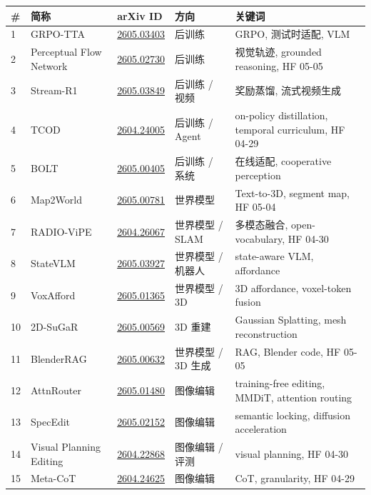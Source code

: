 \small
\begin{longtable}{p{0.7cm}p{3.0cm}p{2.5cm}p{2.5cm}p{4.8cm}}
\toprule
\# & 简称 & arXiv ID & 方向 & 关键词 \\
\midrule
1 & GRPO-TTA & \href{https://arxiv.org/abs/2605.03403}{2605.03403} & 后训练 & GRPO, 测试时适配, VLM \\
2 & Perceptual Flow Network & \href{https://arxiv.org/abs/2605.02730}{2605.02730} & 后训练 & 视觉轨迹, grounded reasoning, HF 05-05 \\
3 & Stream-R1 & \href{https://arxiv.org/abs/2605.03849}{2605.03849} & 后训练 / 视频 & 奖励蒸馏, 流式视频生成 \\
4 & TCOD & \href{https://arxiv.org/abs/2604.24005}{2604.24005} & 后训练 / Agent & on-policy distillation, temporal curriculum, HF 04-29 \\
5 & BOLT & \href{https://arxiv.org/abs/2605.00405}{2605.00405} & 后训练 / 系统 & 在线适配, cooperative perception \\
6 & Map2World & \href{https://arxiv.org/abs/2605.00781}{2605.00781} & 世界模型 & Text-to-3D, segment map, HF 05-04 \\
7 & RADIO-ViPE & \href{https://arxiv.org/abs/2604.26067}{2604.26067} & 世界模型 / SLAM & 多模态融合, open-vocabulary, HF 04-30 \\
8 & StateVLM & \href{https://arxiv.org/abs/2605.03927}{2605.03927} & 世界模型 / 机器人 & state-aware VLM, affordance \\
9 & VoxAfford & \href{https://arxiv.org/abs/2605.01365}{2605.01365} & 世界模型 / 3D & 3D affordance, voxel-token fusion \\
10 & 2D-SuGaR & \href{https://arxiv.org/abs/2605.00569}{2605.00569} & 3D 重建 & Gaussian Splatting, mesh reconstruction \\
11 & BlenderRAG & \href{https://arxiv.org/abs/2605.00632}{2605.00632} & 世界模型 / 3D 生成 & RAG, Blender code, HF 05-05 \\
12 & AttnRouter & \href{https://arxiv.org/abs/2605.01480}{2605.01480} & 图像编辑 & training-free editing, MMDiT, attention routing \\
13 & SpecEdit & \href{https://arxiv.org/abs/2605.02152}{2605.02152} & 图像编辑 & semantic locking, diffusion acceleration \\
14 & Visual Planning Editing & \href{https://arxiv.org/abs/2604.22868}{2604.22868} & 图像编辑 / 评测 & visual planning, HF 04-30 \\
15 & Meta-CoT & \href{https://arxiv.org/abs/2604.24625}{2604.24625} & 图像编辑 & CoT, granularity, HF 04-29 \\

\end{longtable}

